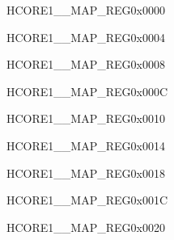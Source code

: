 \begin{register}{H}{CORE1\_\_MAP\_REG}{0x0000}\label{regdesc:CORE1LPRTCINTMAPREG}
\end{register}\vspace{-3em}


\begin{register}{H}{CORE1\_\_MAP\_REG}{0x0004}\label{regdesc:CORE1LPWDTINTMAPREG}
\end{register}\vspace{-3em}


\begin{register}{H}{CORE1\_\_MAP\_REG}{0x0008}\label{regdesc:CORE1LPTIMERREG0INTMAPREG}
\end{register}\vspace{-3em}


\begin{register}{H}{CORE1\_\_MAP\_REG}{0x000C}\label{regdesc:CORE1LPTIMERREG1INTMAPREG}
\end{register}\vspace{-3em}


\begin{register}{H}{CORE1\_\_MAP\_REG}{0x0010}\label{regdesc:CORE1MBHPINTMAPREG}
\end{register}\vspace{-3em}


\begin{register}{H}{CORE1\_\_MAP\_REG}{0x0014}\label{regdesc:CORE1MBLPINTMAPREG}
\end{register}\vspace{-3em}


\begin{register}{H}{CORE1\_\_MAP\_REG}{0x0018}\label{regdesc:CORE1PMUREG0INTMAPREG}
\end{register}\vspace{-3em}


\begin{register}{H}{CORE1\_\_MAP\_REG}{0x001C}\label{regdesc:CORE1PMUREG1INTMAPREG}
\end{register}\vspace{-3em}


\begin{register}{H}{CORE1\_\_MAP\_REG}{0x0020}\label{regdesc:CORE1LPANAPERIINTMAPREG}
\end{register}\vspace{-3em}


